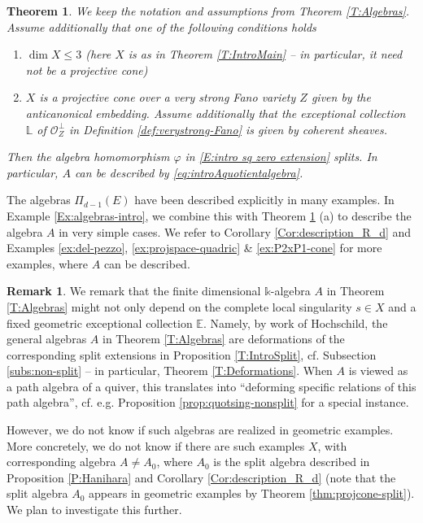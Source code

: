 \documentclass[a4paper,11pt, reqno]{amsart}
\def\E{\mathbb E}
\def\OO{\mathcal O}
\theoremstyle{plain}
\newtheorem{theorem}[dummy]{Theorem}
\theoremstyle{definition}
\newtheorem{remark}[dummy]{Remark}
\numberwithin{equation}{section}
\begin{document}
\begin{theorem} \label{T:introalgebradesc}
     We keep the notation and assumptions from Theorem \ref{T:Algebras}. Assume additionally that one of the following conditions holds
     \begin{enumerate}
         \item $\dim X \leq 3$  (here $X$ is as in Theorem \ref{T:IntroMain} -- in particular, it need not be a projective cone)
         \item $X$ is a projective cone over a very strong Fano variety $Z$ given by the anticanonical embedding. Assume additionally that the  exceptional collection $\mathbb{L}$ of $\OO_Z^\perp$ in Definition \ref{def:verystrong-Fano} is given by coherent sheaves.
     \end{enumerate}
     
     Then the algebra homomorphism $\varphi$ in \eqref{E:intro sq zero extension} splits. In particular, $A$ can be described by \eqref{eq:introAquotientalgebra}.
\end{theorem}

The algebras $\Pi_{d-1}(E)$ have been described explicitly in many examples. In Example \ref{Ex:algebras-intro}, we combine this with Theorem \ref{T:introalgebradesc} (a) to describe the algebra $A$ in very simple cases. We refer to Corollary \ref{Cor:description_R_d} and Examples \ref{ex:del-pezzo}, \ref{ex:projspace-quadric} \& \ref{ex:P2xP1-cone} for more examples, where $A$ can be described.



\begin{remark}
    We remark that the finite dimensional $\mathbb{k}$-algebra $A$ in Theorem \ref{T:Algebras} might not only depend on the complete local singularity $s \in X$ and a fixed geometric exceptional collection $\E$.
    Namely, by work of Hochschild, the general algebras $A$ in Theorem \ref{T:Algebras} are deformations of the corresponding split extensions in Proposition \ref{T:IntroSplit}, cf. Subsection \ref{subs:non-split} -- in particular, Theorem \ref{T:Deformations}. 
    When $A$ is viewed as a path algebra of a quiver, this translates into ``deforming specific relations of this path algebra'', cf. e.g. Proposition \ref{prop:quotsing-nonsplit} for a special instance. 
    
    However, we do not know if such algebras are realized in geometric examples. 
    More concretely, we do not know if there are such examples $X$, with corresponding algebra $A \neq A_0 $, where $A_0 $ is the split algebra described in Proposition \ref{P:Hanihara} and Corollary \ref{Cor:description_R_d} (note that the split algebra $A_0$ appears in geometric examples by Theorem \ref{thm:projcone-split}). 
    We plan to investigate this further.
\end{remark}
\end{document}
